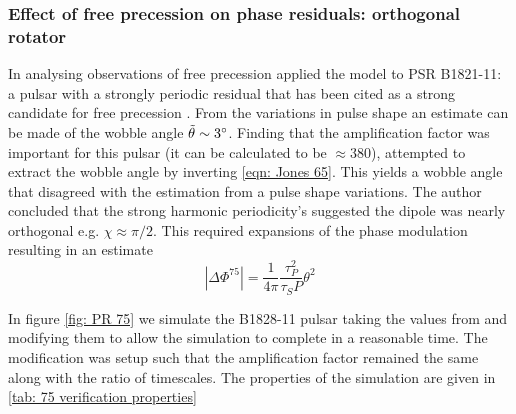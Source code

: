 \subsubsection{Effect of free precession on phase residuals: orthogonal rotator}

In analysing observations of free precession \citet{Jones2001} applied the
model to PSR B1821-11: a pulsar with a strongly periodic residual that has been
cited as a strong candidate for free precession \citet{Stairs2000}. From the
variations in pulse shape an estimate can be made of the wobble angle
$\tilde{\theta} \sim 3^{\circ}$. Finding that the amplification factor was
important for this pulsar (it can be calculated to be $\approx 380$), 
\citet{Jones2001} attempted to extract the wobble
angle by inverting \eqref{eqn: Jones 65}. This yields a wobble angle that
disagreed with the estimation from a pulse shape variations. The author
concluded that the strong harmonic periodicity's suggested the dipole was
nearly orthogonal e.g. $\chi \approx \pi/2$.  This required expansions of the
phase modulation resulting in an estimate
\begin{equation}
    |\Delta\Phi^{75}| = \frac{1}{4\pi} \frac{\tau_{P}^{2}}{\tau_{S} P} \theta^{2}
    \label{eqn: Jones 75}
\end{equation}

In figure \ref{fig: PR 75} we simulate the B1828-11 pulsar taking the values
from \citet{Stairs2000} and modifying them to allow the simulation to complete
in a reasonable time. The modification was setup such that the amplification
factor remained the same along with the ratio of timescales. The properties
of the simulation are given in \ref{tab: 75 verification properties}

\begin{figure}[htb]
\begin{floatrow}
\capbtabbox{%
  
}{%
  \caption{}%
  \label{tab: 75 verification properties}
}
\end{floatrow}
\end{figure}



